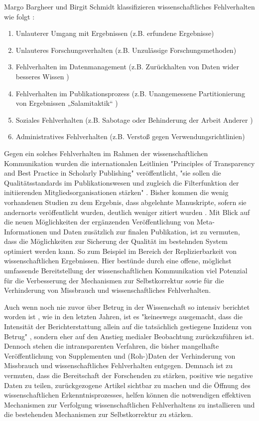 Margo Bargheer und Birgit Schmidt klassifizieren wissenschaftliches Fehlverhalten wie folgt \cite{Bargheer_2015}:
\begin{enumerate}
\item Unlauterer Umgang mit Ergebnissen (z.B. erfundene Ergebnisse)
\item Unlauteres Forschungsverhalten (z.B. Unzulässige Forschungsmethoden)
\item Fehlverhalten im Datenmanagement (z.B. Zurückhalten von Daten wider besseres Wissen )
\item Fehlverhalten im Publikationsprozess (z.B. Unangemessene Partitionierung von Ergebnissen „Salamitaktik“  \cite{binswanger_2014_excellence})
\item Soziales Fehlverhalten (z.B. Sabotage oder Behinderung der Arbeit Anderer )
\item Administratives Fehlverhalten (z.B. Verstoß gegen Verwendungsrichtlinien)
\end{enumerate}

Gegen ein solches Fehlverhalten im Rahmen der wissenschaftlichen Kommunikation wurden die internationalen Leitlinien "Principles of Transparency and Best Practice in Scholarly Publishing" \cite{oaspa_principles_2013} veröffentlicht, "sie sollen die Qualitätsstandards im Publikationswesen und zugleich die Filterfunktion der initiierenden Mitgliedsorganisationen stärken" \cite{Bargheer_2015}. Bisher kommen die wenig vorhandenen Studien zu dem Ergebnis, dass abgelehnte Manuskripte, sofern sie andernorts veröffentlicht wurden, deutlich weniger zitiert wurden \cite{Hornbostel_1997}. Mit Blick auf die neuen Möglichkeiten der ergänzenden Veröffentlichung von Meta-Informationen und Daten zusätzlich zur finalen Publikation, ist zu vermuten, dass die Möglichkeiten zur Sicherung der Qualität im bestehnden System optimiert werden kann. So zum Beispiel im Bereich der Replizierbarkeit von wissenschaftlichen Ergebnissen. Hier bestünde durch eine offene, möglichst umfassende Bereitstellung der wissenschaftlichen Kommunikation viel Potenzial für die Verbesserung der Mechanismen zur Selbstkorrektur \cite{Nosek_2015} sowie für die Verhinderung von Missbrauch und wissenschaftliches Fehlverhalten.

Auch wenn noch nie zuvor über Betrug in der Wissenschaft so intensiv berichtet worden ist \cite{brembs2015open}, wie in den letzten Jahren, ist es "keineswegs ausgemacht, dass die Intensität der Berichterstattung allein auf die tatsächlich gestiegene Inzidenz von Betrug" \cite{weingart_2005_wissenschaft}, sondern eher auf den Anstieg medialer Beobachtung zurückzuführen ist. Dennoch stehen die intransparenten Verfahren, die bisher mangelhafte Veröffentlichung von Supplementen und (Roh-)Daten der Verhinderung von Missbrauch und wissenschaftliches Fehlverhalten entgegen. Demnach ist zu vermuten, dass die Bereitschaft der Forschenden zu stärken, positive wie negative Daten zu teilen, zurückgezogene Artikel sichtbar zu machen und die Öffnung des wissenschaftlichen Erkenntnisprozesses, helfen können die notwendigen effektiven Mechanismen zur Verfolgung wissenschaftlichen Fehlverhaltens \cite[:14]{wr_2015_wissenschaft_integritaet} zu installieren und die bestehenden Mechanismen zur Selbstkorrektur zu stärken.

